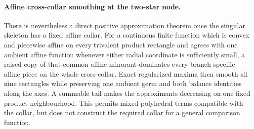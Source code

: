 \paragraph{Affine cross-collar smoothing at the two-star node.}
There is nevertheless a direct positive approximation theorem once the
singular skeleton has a fixed affine collar.  For a continuous finite
function which is convex and piecewise affine on every trivalent product
rectangle and agrees with one ambient affine function whenever either
radial coordinate is sufficiently small, a raised copy of that common
affine minorant dominates every branch-specific affine piece on the whole
cross-collar.  Exact regularized maxima then smooth all nine rectangles
while preserving one ambient germ and both balance identities along the
axes.  A summable tail makes the approximants decreasing on one fixed
product neighbourhood.  This permits mixed polyhedral terms compatible
with the collar, but does not construct the required collar for
a general comparison function.




